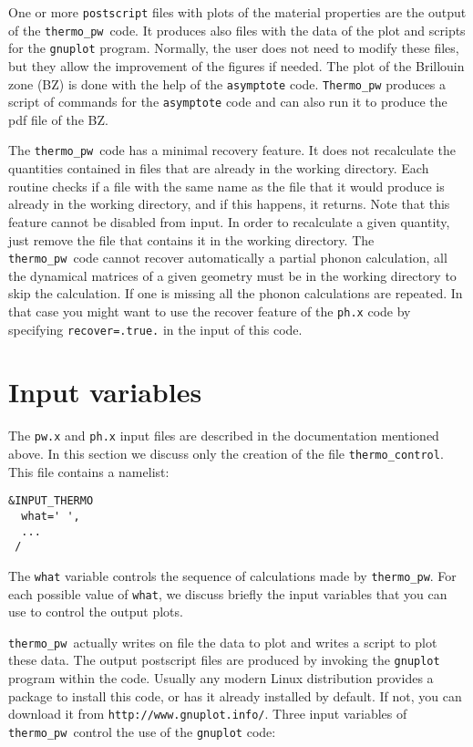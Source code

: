 \documentclass[12pt,a4paper]{article}
\def\thermo{\texttt{thermo\_pw}}
\begin{document}
One or more \texttt{postscript} files with plots of the material properties
are the output of the \thermo\ code. It produces also files with the data of 
the plot and scripts for the \texttt{gnuplot} program. 
Normally, the user does not need to modify these files, but they allow 
the improvement of the figures if needed.
The plot of the Brillouin zone (BZ) is done with the help of the 
\texttt{asymptote} code. \texttt{Thermo\_pw} produces a script of commands
for the \texttt{asymptote} code and can also run it to produce the pdf
file of the BZ.

The \thermo\ code has a minimal recovery feature. It does not recalculate
the quantities contained in files that are already in the working
directory. Each routine checks if a file with the same name
as the file that it would produce is already in the working directory,
and if this happens, it returns. Note that this feature cannot be 
disabled from input. In order to recalculate a given quantity, just remove
the file that contains it in the working directory.
The \thermo\ code cannot recover automatically a partial phonon calculation, all 
the dynamical matrices of a given geometry must be in the working directory to 
skip the calculation. If one is missing all the phonon calculations are repeated. 
In that case you might want to use the recover feature  of the \texttt{ph.x} code 
by specifying \texttt{recover=.true.} in the input of this code.

\section{Input variables}

The \texttt{pw.x} and \texttt{ph.x} input files are described in the documentation
mentioned above. In this section we discuss only the creation of the file
\texttt{thermo\_control}. This file contains a namelist:  
\begin{verbatim}
&INPUT_THERMO
  what=' ',
  ...
 /
\end{verbatim}
The \texttt{what} variable controls the sequence of calculations made
by \thermo. For each possible value of \texttt{what}, we discuss briefly the
input variables that you can use to control the output plots.

\thermo\ actually writes on file the data to plot and writes a script to plot
these data. The output postscript files are produced by invoking the 
\texttt{gnuplot} program within the code. Usually any modern Linux 
distribution provides a package to install this code, or has it already 
installed by default. If not, you can download it from 
\texttt{http://www.gnuplot.info/}. Three input variables of \thermo\ control 
the use of the \texttt{gnuplot} code:
\end{document}
